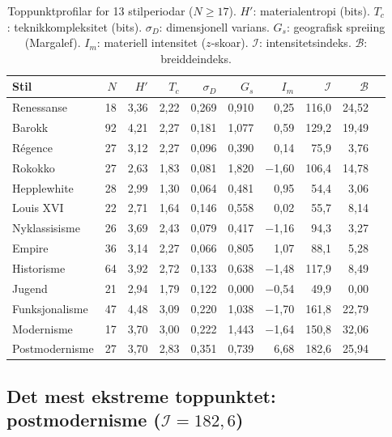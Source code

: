 \documentclass[10pt, a4paper, twocolumn]{article}
\begin{document}
\begin{table}[!ht]
\centering
\caption{Toppunktprofilar for 13 stilperiodar ($N \geq 17$). $H'$: materialentropi (bits). $T_c$: teknikkompleksitet (bits). $\sigma_D$: dimensjonell varians. $G_s$: geografisk spreiing (Margalef). $I_m$: materiell intensitet ($z$-skoar). $\mathcal{I}$: intensitetsindeks. $\mathcal{B}$: breiddeindeks.}
\label{tab:toppprofilar}
\begin{tabular}{lrrrrrrrrr}
\toprule
\textbf{Stil} & $N$ & $H'$ & $T_c$ & $\sigma_D$ & $G_s$ & $I_m$ & $\mathcal{I}$ & $\mathcal{B}$ \\
\midrule
Renessanse       & 18 & 3,36 & 2,22 & 0,269 & 0,910 & 0,25  & 116,0 & 24,52 \\
Barokk           & 92 & 4,21 & 2,27 & 0,181 & 1,077 & 0,59  & 129,2 & 19,49 \\
R\'{e}gence      & 27 & 3,12 & 2,27 & 0,096 & 0,390 & 0,14  &  75,9 &  3,76 \\
Rokokko          & 27 & 2,63 & 1,83 & 0,081 & 1,820 & $-$1,60 & 106,4 & 14,78 \\
Hepplewhite      & 28 & 2,99 & 1,30 & 0,064 & 0,481 & 0,95  &  54,4 &  3,06 \\
Louis XVI        & 22 & 2,71 & 1,64 & 0,146 & 0,558 & 0,02  &  55,7 &  8,14 \\
Nyklassisisme    & 26 & 3,69 & 2,43 & 0,079 & 0,417 & $-$1,16 &  94,3 &  3,27 \\
Empire           & 36 & 3,14 & 2,27 & 0,066 & 0,805 & 1,07  &  88,1 &  5,28 \\
Historisme       & 64 & 3,92 & 2,72 & 0,133 & 0,638 & $-$1,48 & 117,9 &  8,49 \\
Jugend           & 21 & 2,94 & 1,79 & 0,122 & 0,000 & $-$0,54 &  49,9 &  0,00 \\
Funksjonalisme   & 47 & 4,48 & 3,09 & 0,220 & 1,038 & $-$1,70 & 161,8 & 22,79 \\
Modernisme       & 17 & 3,70 & 3,00 & 0,222 & 1,443 & $-$1,64 & 150,8 & 32,06 \\
Postmodernisme   & 27 & 3,70 & 2,83 & 0,351 & 0,739 & 6,68  & 182,6 & 25,94 \\
\bottomrule
\end{tabular}
\end{table}


\subsection{Det mest ekstreme toppunktet: postmodernisme ($\mathcal{I} = 182{,}6$)}
\end{document}
